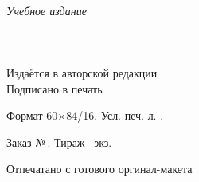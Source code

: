 \newpage
\thispagestyle{empty}
~\vfill
\begin{centering}
  \textit{Учебное издание}\\[18pt]
  \AuthorF\\[6pt]
  {\large\Title}\\[6pt]
  \PubType\\[18pt]
  Издаётся в авторской редакции\\
  \vspace{18pt}
  Подписано в печать \PUBDATE

  Формат 60×84/16. Усл. печ. л. \SHEETS.
  
  Заказ №\,\PUBORDER. Тираж \PUBCOUNT\ экз.

  \vspace{6pt}

  Отпечатано с готового оргинал-макета

  \PUBLISHER

  \PUBADDR
  
  \LICENSE
  
\end{centering}
\vspace{1cm}
